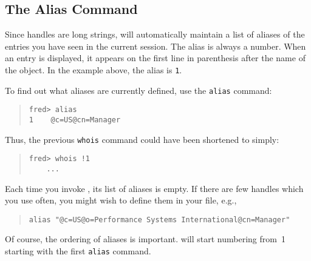 \subsection	{The Alias Command}
Since handles are long strings,
 will automatically maintain a list of aliases of the entries you
have seen in the current session.
The alias is always a number.
When an entry is displayed,
it appears on the first line in parenthesis after the name of the object.
In the example above,
the alias is \verb"1".

To find out what aliases are currently defined,
use the \verb"alias" command:
\begin{quote}\smaller\begin{verbatim}
fred> alias
1    @c=US@cn=Manager
\end{verbatim}\end{quote}
Thus,
the previous \verb"whois" command could have been shortened to simply:
\begin{quote}\small\begin{verbatim}
fred> whois !1
    ...
\end{verbatim}\end{quote}
Each time you invoke ,
its list of aliases is empty.
If there are few handles which you use often,
you might wish to define them in your  file,
e.g.,
\begin{quote}\small\begin{verbatim}
alias "@c=US@o=Performance Systems International@cn=Manager"
\end{verbatim}\end{quote}
Of course,
the ordering of aliases is important.
 will start numbering from~1 starting with the first \verb"alias"
command.

